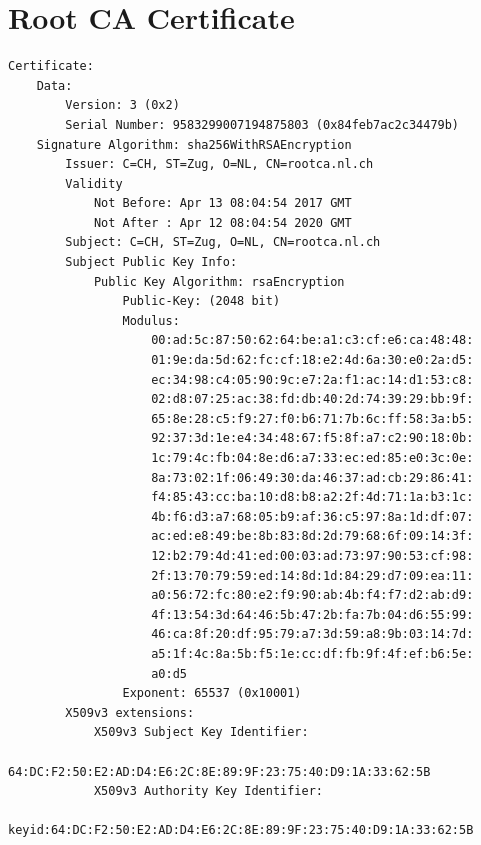 \documentclass[a4paper]{report}
\begin{document}
\chapter{Root CA Certificate}

\begin{lstlisting}[language={}, basicstyle=\ttfamily\scriptsize, numberstyle=\ttfamily\scriptsize, stepnumber=5, firstnumber=1, numberfirstline=false]
Certificate:
    Data:
        Version: 3 (0x2)
        Serial Number: 9583299007194875803 (0x84feb7ac2c34479b)
    Signature Algorithm: sha256WithRSAEncryption
        Issuer: C=CH, ST=Zug, O=NL, CN=rootca.nl.ch
        Validity
            Not Before: Apr 13 08:04:54 2017 GMT
            Not After : Apr 12 08:04:54 2020 GMT
        Subject: C=CH, ST=Zug, O=NL, CN=rootca.nl.ch
        Subject Public Key Info:
            Public Key Algorithm: rsaEncryption
                Public-Key: (2048 bit)
                Modulus:
                    00:ad:5c:87:50:62:64:be:a1:c3:cf:e6:ca:48:48:
                    01:9e:da:5d:62:fc:cf:18:e2:4d:6a:30:e0:2a:d5:
                    ec:34:98:c4:05:90:9c:e7:2a:f1:ac:14:d1:53:c8:
                    02:d8:07:25:ac:38:fd:db:40:2d:74:39:29:bb:9f:
                    65:8e:28:c5:f9:27:f0:b6:71:7b:6c:ff:58:3a:b5:
                    92:37:3d:1e:e4:34:48:67:f5:8f:a7:c2:90:18:0b:
                    1c:79:4c:fb:04:8e:d6:a7:33:ec:ed:85:e0:3c:0e:
                    8a:73:02:1f:06:49:30:da:46:37:ad:cb:29:86:41:
                    f4:85:43:cc:ba:10:d8:b8:a2:2f:4d:71:1a:b3:1c:
                    4b:f6:d3:a7:68:05:b9:af:36:c5:97:8a:1d:df:07:
                    ac:ed:e8:49:be:8b:83:8d:2d:79:68:6f:09:14:3f:
                    12:b2:79:4d:41:ed:00:03:ad:73:97:90:53:cf:98:
                    2f:13:70:79:59:ed:14:8d:1d:84:29:d7:09:ea:11:
                    a0:56:72:fc:80:e2:f9:90:ab:4b:f4:f7:d2:ab:d9:
                    4f:13:54:3d:64:46:5b:47:2b:fa:7b:04:d6:55:99:
                    46:ca:8f:20:df:95:79:a7:3d:59:a8:9b:03:14:7d:
                    a5:1f:4c:8a:5b:f5:1e:cc:df:fb:9f:4f:ef:b6:5e:
                    a0:d5
                Exponent: 65537 (0x10001)
        X509v3 extensions:
            X509v3 Subject Key Identifier: 
                64:DC:F2:50:E2:AD:D4:E6:2C:8E:89:9F:23:75:40:D9:1A:33:62:5B
            X509v3 Authority Key Identifier: 
                keyid:64:DC:F2:50:E2:AD:D4:E6:2C:8E:89:9F:23:75:40:D9:1A:33:62:5B


\end{lstlisting}
\end{document}
